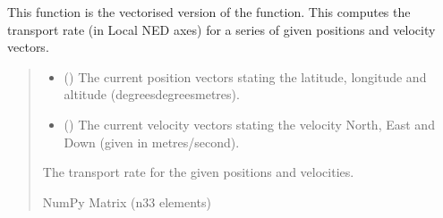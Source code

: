 \documentclass[letterpaper,10pt,english]{sphinxmanual}
\begin{document}
\begin{fulllineitems}
\label{\detokenize{modules/util/transformations:qnav.util.transformations.get_transport_rate_vec}}
\pysigstartsignatures
{}
\pysigstopsignatures
\sphinxAtStartPar
This function is the vectorised version of the
{\hyperref[\detokenize{modules/util/transformations:qnav.util.transformations.get_transport_rate}]{}}
function. This computes the transport rate (in Local NED axes)
for a series of given positions and velocity vectors.
\begin{quote}\begin{description}
\begin{itemize}
\item {} 
\sphinxAtStartPar
{} (\sphinxstyleliteralemphasis{\sphinxupquote{ (}}\sphinxstyleliteralemphasis{\sphinxupquote{)}}) \textendash{} The current position vectors stating the latitude,
longitude and altitude (degrees\sphinxhyphen{}degrees\sphinxhyphen{}metres).

\item {} 
\sphinxAtStartPar
{} (\sphinxstyleliteralemphasis{\sphinxupquote{ (}}\sphinxstyleliteralemphasis{\sphinxupquote{)}}) \textendash{} The current velocity vectors stating the velocity
North, East and Down (given in metres/second).

\end{itemize}

\sphinxAtStartPar
The transport rate for the given positions and velocities.

\sphinxAtStartPar
NumPy Matrix (n\sphinxhyphen{}3\sphinxhyphen{}3 elements)

\end{description}\end{quote}

\end{fulllineitems}
\end{document}
